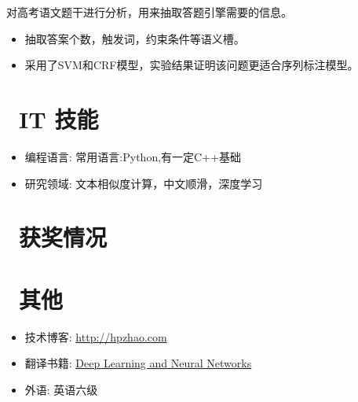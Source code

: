 \documentclass{resume}
\begin{document}
\begin{onehalfspacing}
	对高考语文题干进行分析，用来抽取答题引擎需要的信息。
	\begin{itemize}
		\item 抽取答案个数，触发词，约束条件等语义槽。
		\item 采用了SVM和CRF模型，实验结果证明该问题更适合序列标注模型。
	\end{itemize} 
\end{onehalfspacing}

\section{\faCogs\ IT 技能}
\begin{itemize}[parsep=0.5ex]
  \item 编程语言: 常用语言:Python,有一定C++基础
  \item 研究领域: 文本相似度计算，中文顺滑，深度学习
  
\end{itemize}

\section{\faHeartO\ 获奖情况}

\section{\faInfo\ 其他}
\begin{itemize}[parsep=0.5ex]
  \item 技术博客: \href{http://hpzhao.com}{http://hpzhao.com}
  \item 翻译书籍: \href{http://hpzhao.com/2016/07/10/%E3%80%90%E8%AF%91%E3%80%91%E7%A5%9E%E7%BB%8F%E7%BD%91%E7%BB%9C%E4%B8%8E%E6%B7%B1%E5%BA%A6%E5%AD%A6%E4%B9%A0/}{Deep Learning and Neural Networks}
  \item 外语: 英语六级
\end{itemize}
\end{document}
